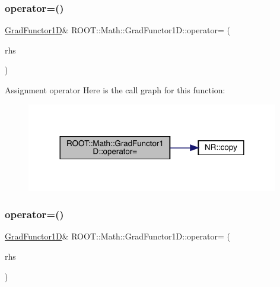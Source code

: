 \subsubsection{\texorpdfstring{operator=()}{operator=()}\hspace{0.1cm}{\footnotesize\ttfamily [2/3]}}
{\footnotesize\ttfamily \mbox{\hyperlink{classROOT_1_1Math_1_1GradFunctor1D}{Grad\+Functor1D}}\& R\+O\+O\+T\+::\+Math\+::\+Grad\+Functor1\+D\+::operator= (\begin{DoxyParamCaption}\item[{const \mbox{\hyperlink{classROOT_1_1Math_1_1GradFunctor1D}{Grad\+Functor1D}} \&}]{rhs }\end{DoxyParamCaption})\hspace{0.3cm}{\ttfamily [inline]}}

Assignment operator Here is the call graph for this function\+:
\nopagebreak
\begin{figure}[H]
\begin{center}
\leavevmode
\includegraphics[width=312pt]{d3/d76/classROOT_1_1Math_1_1GradFunctor1D_a3ea006d92100ba76a6fae9f57499c60d_cgraph}
\end{center}
\end{figure}
\mbox{\label{classROOT_1_1Math_1_1GradFunctor1D_a3ea006d92100ba76a6fae9f57499c60d}} 
\subsubsection{\texorpdfstring{operator=()}{operator=()}\hspace{0.1cm}{\footnotesize\ttfamily [3/3]}}
{\footnotesize\ttfamily \mbox{\hyperlink{classROOT_1_1Math_1_1GradFunctor1D}{Grad\+Functor1D}}\& R\+O\+O\+T\+::\+Math\+::\+Grad\+Functor1\+D\+::operator= (\begin{DoxyParamCaption}\item[{const \mbox{\hyperlink{classROOT_1_1Math_1_1GradFunctor1D}{Grad\+Functor1D}} \&}]{rhs }\end{DoxyParamCaption})\hspace{0.3cm}{\ttfamily [inline]}}

